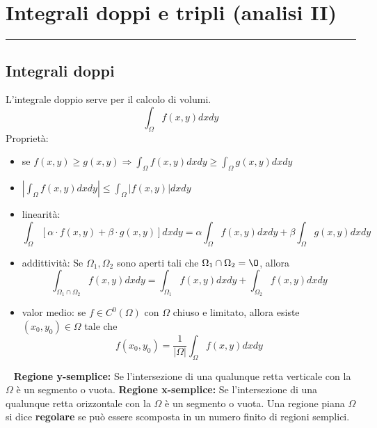\section{Integrali doppi e tripli (analisi II)}
\rule{\textwidth}{2pt}
\subsection{Integrali doppi}
L'integrale doppio serve per il calcolo di volumi.\newline
\[
    \int_{\Omega} f(x,y) dxdy
\]
Proprietà:
\begin{itemize}
    \item se $f(x,y)\geq g(x,y) \Rightarrow \int_\Omega f(x,y) dxdy \geq \int_{\Omega} g(x,y)dxdy$
    \item $|\int_{\Omega}f(x,y) dxdy| \leq \int_{\Omega}|f(x,y)|dxdy$
    \item linearità:
    \[
        \int_{\Omega}[\alpha \cdot f(x,y) + \beta \cdot g(x,y)]dxdy = \alpha \int_{\Omega} f(x,y) dxdy + \beta \int_{\Omega} g(x,y) dxdy
    \]
    \item addittività: Se $\Omega_1, \Omega_2$ sono aperti tali che $\Omega_1 \cap \Omega_2 = \O$, allora
    \[
        \int_{\Omega_1 \cap \Omega_2}f(x,y)dxdy = \int_{\Omega_1} f(x,y) dxdy + \int_{\Omega_2} f(x,y) dxdy
    \]
    \item valor medio: se $f \in C^0(\Omega)$ con $\Omega$ chiuso e limitato, allora esiste $(x_0, y_0) \in\Omega$ tale che 
    \[
        f(x_0, y_0) = \frac{1}{|\Omega|}\int_{\Omega}f(x,y)dxdy
    \]
\end{itemize}
\ \newline
\textbf{Regione y-semplice:} Se l'intersezione di una qualunque retta verticale con la $\Omega$ è un segmento o vuota.\newline
\textbf{Regione x-semplice:} Se l'intersezione di una qualunque retta orizzontale con la $\Omega$ è un segmento o vuota.\newline
\newline
Una regione piana $\Omega$ si dice \textbf{regolare} se può essere scomposta in un numero finito di regioni semplici.
